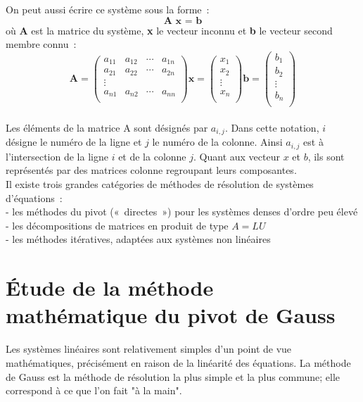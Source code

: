 \documentclass[a4paper,12pt]{report}
\begin{document}
On peut aussi écrire ce système sous la forme :
$$\textbf{A x = b}$$
où \textbf{A} est la matrice du système, \textbf{x} le vecteur inconnu et \textbf{b} le vecteur second membre connu :
$$
\textbf{A}=\begin{pmatrix}
a_{11} & a_{12} & \cdots & a_{1n} \\
a_{21} & a_{22} & \cdots & a_{2n} \\
\vdots \\
a_{n1} & a_{n2} & \cdots & a_{nn} \\
\end{pmatrix}
\textbf{x}=\begin{pmatrix}
x_{1}\\
x_{2}\\
\vdots\\
x_{n}\\
\end{pmatrix}
\textbf{b}=\begin{pmatrix}
b_{1}\\
b_{2}\\
\vdots\\
b_{n}\\
\end{pmatrix}
$$\\
Les éléments de la matrice A sont désignés par $a_{i,j}$. Dans cette notation, $i$ désigne le numéro de la ligne et $j$ le numéro de la colonne. Ainsi $a_{i,j}$ est à l’intersection de la ligne $i$ et de la colonne $j$.
Quant aux vecteur $x$ et $b$, ils sont représentés par des matrices colonne regroupant leurs composantes. \\

Il existe trois grandes catégories de méthodes de résolution de systèmes d’équations :\\
- les méthodes du pivot (« directes ») pour les systèmes denses d’ordre peu élevé\\
- les décompositions de matrices en produit de type $A=LU$\\
- les méthodes itératives, adaptées aux systèmes non linéaires\\
\newpage
\section{Étude de la méthode mathématique du pivot de Gauss}

Les systèmes linéaires sont relativement simples d'un point de vue mathématiques, précisément en raison de la linéarité des équations. La méthode de Gauss est la méthode de résolution la plus simple et la plus commune; elle correspond à ce que l'on fait "à la main".\\
\end{document}
